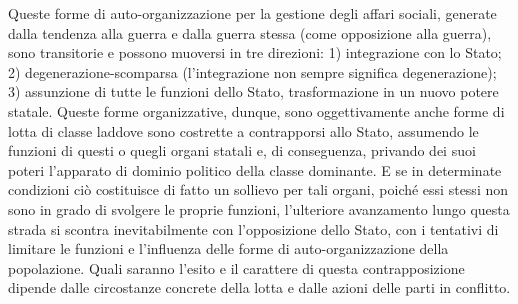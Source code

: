 \documentclass[12pt,a4paper,openany]{book}
\begin{document}
Queste forme di auto-organizzazione per la gestione degli affari sociali, generate dalla tendenza alla guerra e dalla guerra stessa (come opposizione alla guerra), sono transitorie e possono muoversi in tre direzioni: 1) integrazione con lo Stato; 2) degenerazione-scomparsa (l'integrazione non sempre significa degenerazione); 3) assunzione di tutte le funzioni dello Stato, trasformazione in un nuovo potere statale. Queste forme organizzative, dunque, sono oggettivamente anche forme di lotta di classe laddove sono costrette a contrapporsi allo Stato, assumendo le funzioni di questi o quegli organi statali e, di conseguenza, privando dei suoi poteri l'apparato di dominio politico della classe dominante. E se in determinate condizioni ciò costituisce di fatto un sollievo per tali organi, poiché essi stessi non sono in grado di svolgere le proprie funzioni, l'ulteriore avanzamento lungo questa strada si scontra inevitabilmente con l'opposizione dello Stato, con i tentativi di limitare le funzioni e l'influenza delle forme di auto-organizzazione della popolazione. Quali saranno l'esito e il carattere di questa contrapposizione dipende dalle circostanze concrete della lotta e dalle azioni delle parti in conflitto.
\end{document}
